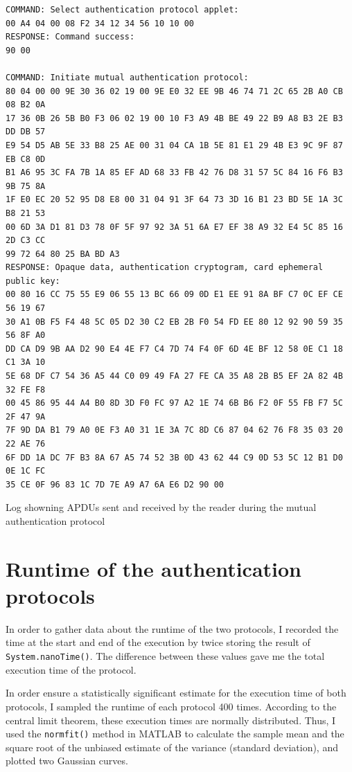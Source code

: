 \documentclass[12pt,a4paper,twoside,openright]{report}
\begin{document}
\begin{listing}
\begin{verbatim}
COMMAND: Select authentication protocol applet:
00 A4 04 00 08 F2 34 12 34 56 10 10 00
RESPONSE: Command success:
90 00

COMMAND: Initiate mutual authentication protocol:
80 04 00 00 9E 30 36 02 19 00 9E E0 32 EE 9B 46 74 71 2C 65 2B A0 CB 08 B2 0A
17 36 0B 26 5B B0 F3 06 02 19 00 10 F3 A9 4B BE 49 22 B9 A8 B3 2E B3 DD DB 57
E9 54 D5 AB 5E 33 B8 25 AE 00 31 04 CA 1B 5E 81 E1 29 4B E3 9C 9F 87 EB C8 0D
B1 A6 95 3C FA 7B 1A 85 EF AD 68 33 FB 42 76 D8 31 57 5C 84 16 F6 B3 9B 75 8A
1F E0 EC 20 52 95 D8 E8 00 31 04 91 3F 64 73 3D 16 B1 23 BD 5E 1A 3C B8 21 53
00 6D 3A D1 81 D3 78 0F 5F 97 92 3A 51 6A E7 EF 38 A9 32 E4 5C 85 16 2D C3 CC
99 72 64 80 25 BA BD A3
RESPONSE: Opaque data, authentication cryptogram, card ephemeral public key:
00 80 16 CC 75 55 E9 06 55 13 BC 66 09 0D E1 EE 91 8A BF C7 0C EF CE 56 19 67
30 A1 0B F5 F4 48 5C 05 D2 30 C2 EB 2B F0 54 FD EE 80 12 92 90 59 35 56 8F A0
DD CA D9 9B AA D2 90 E4 4E F7 C4 7D 74 F4 0F 6D 4E BF 12 58 0E C1 18 C1 3A 10
5E 68 DF C7 54 36 A5 44 C0 09 49 FA 27 FE CA 35 A8 2B B5 EF 2A 82 4B 32 FE F8
00 45 86 95 44 A4 B0 8D 3D F0 FC 97 A2 1E 74 6B B6 F2 0F 55 FB F7 5C 2F 47 9A
7F 9D DA B1 79 A0 0E F3 A0 31 1E 3A 7C 8D C6 87 04 62 76 F8 35 03 20 22 AE 76
6F DD 1A DC 7F B3 8A 67 A5 74 52 3B 0D 43 62 44 C9 0D 53 5C 12 B1 D0 0E 1C FC
35 CE 0F 96 83 1C 7D 7E A9 A7 6A E6 D2 90 00
\end{verbatim}
\caption{Log showning APDUs sent and received by the reader during the mutual authentication protocol}
\label{mutualauthlog}
\end{listing}

\section{Runtime of the authentication protocols}

In order to gather data about the runtime of the two protocols, I recorded the time at the start and end of the execution by twice storing the result of \texttt{System.nanoTime()}. The difference between these values gave me the total execution time of the protocol.

In order ensure a statistically significant estimate for the execution time of both protocols, I sampled the runtime of each protocol 400 times. According to the central limit theorem, these execution times are normally distributed. Thus, I used the \texttt{normfit()} method in MATLAB to calculate the sample mean and the square root of the unbiased estimate of the variance (standard deviation), and plotted two Gaussian curves.
\end{document}
